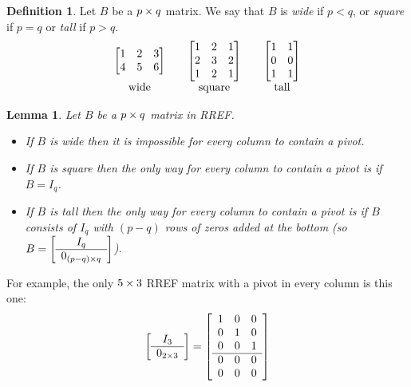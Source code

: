 \documentclass[reqno]{amsart}
\newtheorem{lemma}[theorem]{Lemma}
\theoremstyle{definition}
\newtheorem{definition}[theorem]{Definition}
\newcommand{\dfn}[1]{\emph{{#1}}\index{#1}}
\begin{document}
\begin{definition}\label{defn-wide}
 Let $B$ be a $p\times q$ matrix.  We say that $B$ is \dfn{wide} if
 $p<q$, or \dfn{square} if $p=q$ or \dfn{tall} if $p>q$.
 \[ \begin{array}{ccccc}
     \left[\begin{matrix} 1 & 2 & 3 \\ 4 & 5 & 6 \end{matrix}\right] & &
     \left[\begin{matrix} 1 & 2 & 1 \\ 2 & 3 & 2 \\ 1 & 2 & 1 \end{matrix}\right] & &
     \left[\begin{matrix} 1 & 1 \\ 0 & 0 \\ 1 & 1 \end{matrix}\right] \\
     \text{ wide } & & \text{ square } & & \text{ tall }
    \end{array}
 \]
\end{definition}
\begin{lemma}\label{lem-pivots-everywhere}
 Let $B$ be a $p\times q$ matrix in RREF.
 \begin{itemize}
  \item[(a)] If $B$ is wide then it is impossible for every column to
   contain a pivot.
  \item[(b)] If $B$ is square then the only way for every column to
   contain a pivot is if $B=I_q$.
  \item[(c)] If $B$ is tall  then the only way for every column to
   contain a pivot is if $B$ consists of $I_q$ with $(p-q)$ rows of
   zeros added at the bottom (so
   $B=\left[\begin{array}{c} I_q \\ \hline 0_{(p-q)\times q}
      \end{array}\right]$).
 \end{itemize}
\end{lemma}

For example, the only $5\times 3$ RREF matrix with a pivot in every
column is this one:
\[ \left[\begin{array}{c}
      I_3 \\ \hline 0_{2\times 3} 
   \end{array}\right] =
   \left[\begin{array}{ccc}
    1 & 0 & 0 \\
    0 & 1 & 0 \\
    0 & 0 & 1 \\ \hline
    0 & 0 & 0 \\
    0 & 0 & 0
   \end{array}\right]
\]
\end{document}
